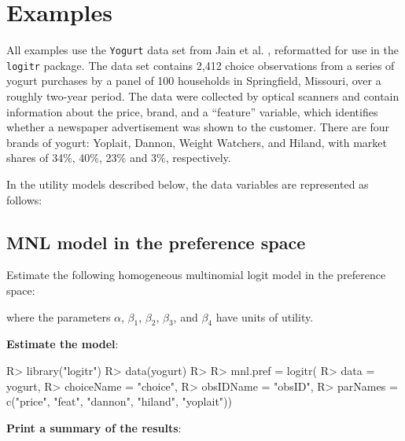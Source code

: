 \documentclass[article]{jss}
\begin{document}
\newpage

\hypertarget{examples}{%
\section{Examples}\label{examples}}

All examples use the \texttt{Yogurt} data set from Jain et al.
\citeyearpar{Jain1994}, reformatted for use in the \texttt{logitr}
package. The data set contains 2,412 choice observations from a series
of yogurt purchases by a panel of 100 households in Springfield,
Missouri, over a roughly two-year period. The data were collected by
optical scanners and contain information about the price, brand, and a
``feature'' variable, which identifies whether a newspaper advertisement
was shown to the customer. There are four brands of yogurt: Yoplait,
Dannon, Weight Watchers, and Hiland, with market shares of 34\%, 40\%,
23\% and 3\%, respectively.

In the utility models described below, the data variables are
represented as follows:



\newpage

\hypertarget{mnl-model-in-the-preference-space}{%
\subsection{MNL model in the preference
space}\label{mnl-model-in-the-preference-space}}

Estimate the following homogeneous multinomial logit model in the
preference space:



where the parameters \(\alpha\), \(\beta_1\), \(\beta_2\), \(\beta_3\),
and \(\beta_4\) have units of utility.

\textbf{Estimate the model}:

\begin{CodeChunk}

\begin{CodeInput}
R> library("logitr")
R> data(yogurt)
R> 
R> mnl.pref = logitr(
R>   data       = yogurt,
R>   choiceName = "choice",
R>   obsIDName  = "obsID",
R>   parNames   = c("price", "feat", "dannon", "hiland", "yoplait"))
\end{CodeInput}
\end{CodeChunk}

\textbf{Print a summary of the results}:
\end{document}
